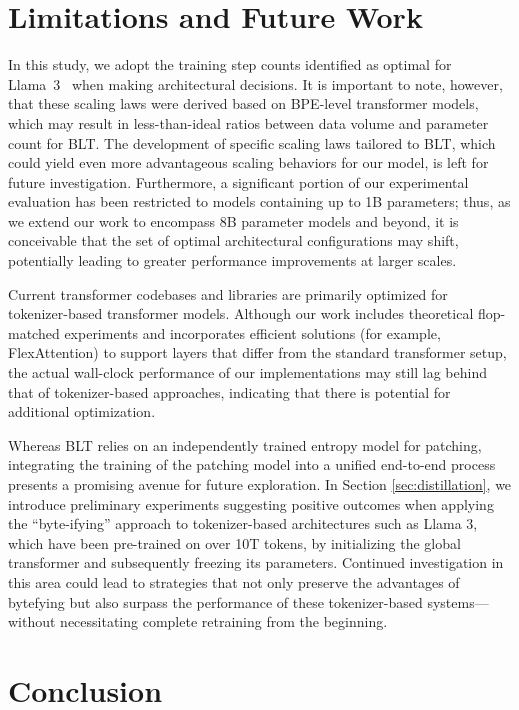 \section{Limitations and Future Work}

In this study, we adopt the training step counts identified as optimal for Llama~3~\citep{dubey2024llama} when making architectural decisions. It is important to note, however, that these scaling laws were derived based on BPE-level transformer models, which may result in less-than-ideal ratios between data volume and parameter count for {\textsc BLT}. The development of specific scaling laws tailored to {\textsc BLT}, which could yield even more advantageous scaling behaviors for our model, is left for future investigation. Furthermore, a significant portion of our experimental evaluation has been restricted to models containing up to 1B parameters; thus, as we extend our work to encompass 8B parameter models and beyond, it is conceivable that the set of optimal architectural configurations may shift, potentially leading to greater performance improvements at larger scales.

Current transformer codebases and libraries are primarily optimized for tokenizer-based transformer models. Although our work includes theoretical flop-matched experiments and incorporates efficient solutions (for example, FlexAttention) to support layers that differ from the standard transformer setup, the actual wall-clock performance of our implementations may still lag behind that of tokenizer-based approaches, indicating that there is potential for additional optimization.

Whereas {\textsc BLT} relies on an independently trained entropy model for patching, integrating the training of the patching model into a unified end-to-end process presents a promising avenue for future exploration. In Section \ref{sec:distillation}, we introduce preliminary experiments suggesting positive outcomes when applying the “byte-ifying” approach to tokenizer-based architectures such as Llama 3, which have been pre-trained on over 10T tokens, by initializing the global transformer and subsequently freezing its parameters. Continued investigation in this area could lead to strategies that not only preserve the advantages of bytefying but also surpass the performance of these tokenizer-based systems—without necessitating complete retraining from the beginning.

\section{Conclusion}
\label{section:conclusion}

